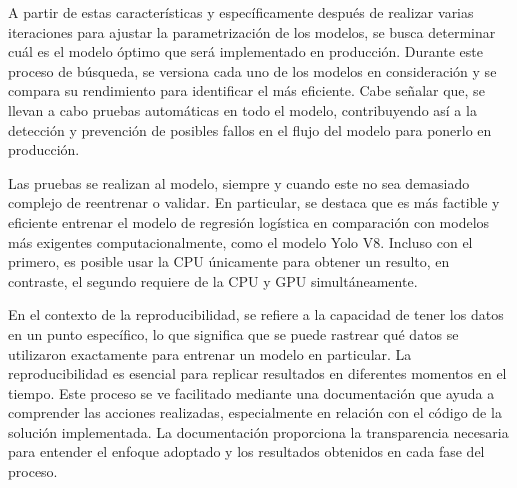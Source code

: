 A partir de estas características y específicamente después de realizar varias iteraciones para ajustar la parametrización de los modelos, se busca determinar cuál es el modelo óptimo que será implementado en producción. Durante este proceso de búsqueda, se versiona cada uno de los modelos en consideración y se compara su rendimiento para identificar el más eficiente. Cabe señalar que, se llevan a cabo pruebas automáticas en todo el modelo, contribuyendo así a la detección y prevención de posibles fallos en el flujo del modelo para ponerlo en producción. \newline

Las pruebas se realizan al modelo, siempre y cuando este no sea demasiado complejo de reentrenar o validar. En particular, se destaca que es más factible y eficiente entrenar el modelo de regresión logística en comparación con modelos más exigentes computacionalmente, como el modelo Yolo V8. Incluso con el primero, es posible usar la CPU únicamente para obtener un resulto, en contraste, el segundo requiere de la CPU y GPU simultáneamente. \newline

\newpage

En el contexto de la reproducibilidad, se refiere a la capacidad de tener los datos en un punto específico, lo que significa que se puede rastrear qué datos se utilizaron exactamente para entrenar un modelo en particular. La reproducibilidad es esencial para replicar resultados en diferentes momentos en el tiempo. Este proceso se ve facilitado mediante una documentación que ayuda a comprender las acciones realizadas, especialmente en relación con el código de la solución implementada. La documentación proporciona la transparencia necesaria para entender el enfoque adoptado y los resultados obtenidos en cada fase del proceso.

